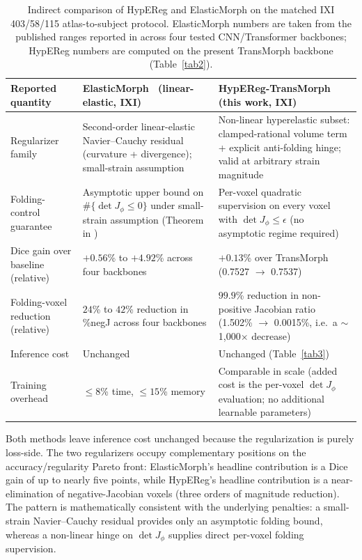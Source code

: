 \documentclass[jimaging,article,submit,pdftex,moreauthors]{Definitions/mdpi}
\begin{document}
\begin{table}[H]
\caption{Indirect comparison of HypEReg and ElasticMorph on the matched IXI 403/58/115 atlas-to-subject protocol. ElasticMorph numbers are taken from the published ranges reported in \cite{elasticmorph2025} across four tested CNN/Transformer backbones; HypEReg numbers are computed on the present TransMorph backbone (Table~\ref{tab2}).\label{tab:em_indirect}}
\centering
\scriptsize
\setlength{\tabcolsep}{4pt}
\begin{tabularx}{\textwidth}{lXX}
\toprule
\textbf{Reported quantity} & \textbf{ElasticMorph~\cite{elasticmorph2025} (linear-elastic, IXI)} & \textbf{HypEReg-TransMorph (this work, IXI)} \\
\midrule
Regularizer family & Second-order linear-elastic Navier--Cauchy residual (curvature + divergence); small-strain assumption & Non-linear hyperelastic subset: clamped-rational volume term + explicit anti-folding hinge; valid at arbitrary strain magnitude \\
Folding-control guarantee & Asymptotic upper bound on $\#\{\det J_\phi\le 0\}$ under small-strain assumption (Theorem in \cite{elasticmorph2025}) & Per-voxel quadratic supervision on every voxel with $\det J_\phi\le\epsilon$ (no asymptotic regime required) \\
Dice gain over baseline (relative) & $+0.56$\% to $+4.92$\% across four backbones & $+0.13$\% over TransMorph (0.7527 $\to$ 0.7537) \\
Folding-voxel reduction (relative) & $24$\% to $42$\% reduction in \%negJ across four backbones & $99.9$\% reduction in non-positive Jacobian ratio (1.502\% $\to$ 0.0015\%, i.e.\ a $\sim$1{,}000$\times$ decrease) \\
Inference cost & Unchanged & Unchanged (Table~\ref{tab3}) \\
Training overhead & $\le 8$\% time, $\le 15$\% memory & Comparable in scale (added cost is the per-voxel $\det J_\phi$ evaluation; no additional learnable parameters) \\
\bottomrule
\end{tabularx}
\parbox{\textwidth}{\footnotesize Both methods leave inference cost unchanged because the regularization is purely loss-side. The two regularizers occupy complementary positions on the accuracy/regularity Pareto front: ElasticMorph's headline contribution is a Dice gain of up to nearly five points, while HypEReg's headline contribution is a near-elimination of negative-Jacobian voxels (three orders of magnitude reduction). The pattern is mathematically consistent with the underlying penalties: a small-strain Navier--Cauchy residual provides only an asymptotic folding bound, whereas a non-linear hinge on $\det J_\phi$ supplies direct per-voxel folding supervision.}
\end{table}
\end{document}

